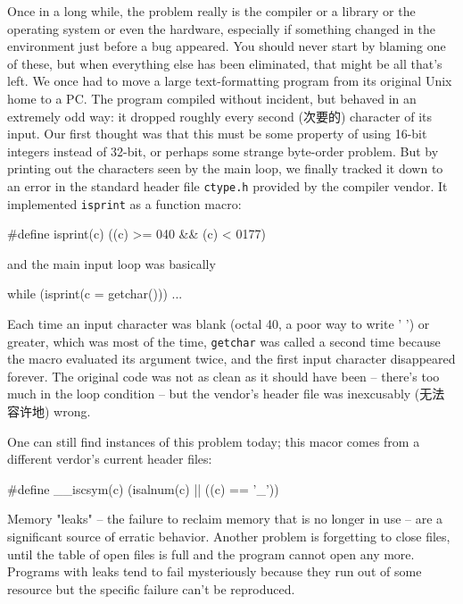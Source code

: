 Once in a long while, the problem really is the compiler or a library or
the operating system or even the hardware, especially if something changed
in the environment just before a bug appeared. You should never start by
blaming one of these, but when everything else has been eliminated, that
might be all that's left. We once had to move a large text-formatting
program from its original Unix home to a PC.  The program compiled without
incident, but behaved in an extremely odd way: it dropped roughly every
second (次要的) character of its input. Our first thought was that this
must be some property of using 16-bit integers instead of 32-bit, or
perhaps some strange byte-order problem. But by printing out the characters
seen by the main loop, we finally tracked it down to an error in the
standard header file \verb'ctype.h' provided by the compiler vendor. It
implemented \verb'isprint' as a function macro:
\begin{badcode}
    #define isprint(c) ((c) >= 040 && (c) < 0177)
\end{badcode}
and the main input loop was basically
\begin{badcode}
    while (isprint(c = getchar()))
        ...
\end{badcode}

Each time an input character was blank (octal 40, a poor way to write ' ')
or greater, which was most of the time, \verb'getchar' was called a second
time because the macro evaluated its argument twice, and the first input
character disappeared forever. The original code was not as clean as it
should have been -- there's too much in the loop condition -- but the
vendor's header file was inexcusably (无法容许地) wrong.

One can still find instances of this problem today; this macor comes from a
different verdor's current header files:
\begin{badcode}
    #define __iscsym(c) (isalnum(c) || ((c) == '_'))
\end{badcode}

Memory "leaks" -- the failure to reclaim memory that is no longer in use --
are a significant source of erratic behavior. Another problem is forgetting
to close files, until the table of open files is full and the program
cannot open any more.  Programs with leaks tend to fail mysteriously
because they run out of some resource but the specific failure can't be
reproduced.

